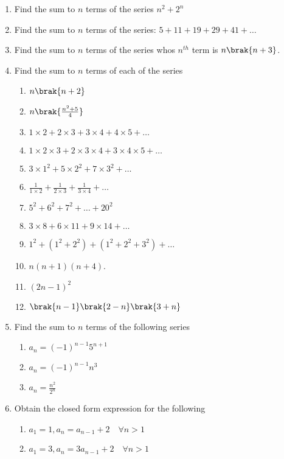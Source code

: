\begin{enumerate}[label=\thesubsection.\arabic*,ref=\thesubsection.\theenumi]
%
\item Find the sum to $n$ terms of the series
$n^2 + 2^n$
	\item Find the sum to $n$ terms of the series: $5+11+19+29+41+\dots$
	\item Find the sum to $n$ terms of the series whos $n^{th}$ term is $n\brak{n+3}$.
\item Find the sum to $n$ terms of each of the series
	\begin{multicols}{2}
		\begin{enumerate}[itemsep=1ex]
			\item $n\brak{n+2}$
			\item $n\brak{\frac{n^2+5}{4}}$
\item $1 \times 2 + 2 \times 3 + 3 \times 4 + 4 \times 5 +\dots $
\item $1 \times 2 \times 3 + 2 \times 3 \times 4 + 3 \times 4 \times 5 + \dots $
\item $3 \times 1^2 + 5 \times 2^2 + 7 \times 3^2 + \dots $
\item $\frac{1}{1 \times 2}+\frac{1}{2\times3}+\frac{1}{3\times4}+\dots $
\item $5^2 + 6^2 + 7^2 + \dots  + 20^2$
\item $3 \times 8 + 6 \times 11 + 9 \times 14 + \dots $
\item $1^2 + (1^2 + 2^2 ) + (1^2 + 2^2 + 3^2 ) + \dots $
\item $n (n+1) (n+4)$.
\item $(2 n - 1)^2$
\item $\brak{n-1}\brak{2-n}\brak{3+n}$
\end{enumerate}
\end{multicols}
\item Find the sum to $n$ terms of the following series
\begin{enumerate}
\item $a_n = (-1)^{n-1}5^{n+1}$
\item $a_n = (-1)^{n-1}n^3$
\item $a_n = \frac{n^2}{2^n}$
\end{enumerate}
\item Obtain the closed form expression for the following
\begin{enumerate}
\item $a_1 = 1, a_n = a_{n-1}+2 \quad \forall n > 1$
\item $a_1 = 3, a_n = 3a_{n-1}+2 \quad \forall n > 1$

\end{enumerate}
\end{enumerate}
